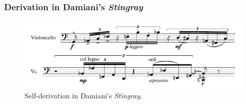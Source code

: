 \begin{frame}
	\frametitle{Derivation in Damiani's \emph{Stingray}}
	\begin{figure}
    	\centering
		\includegraphics[width=\textwidth]{figures/stingray-example.pdf}
		\caption{Self-derivation in Damiani's \emph{Stingray}.}
	\end{figure}
\end{frame}
